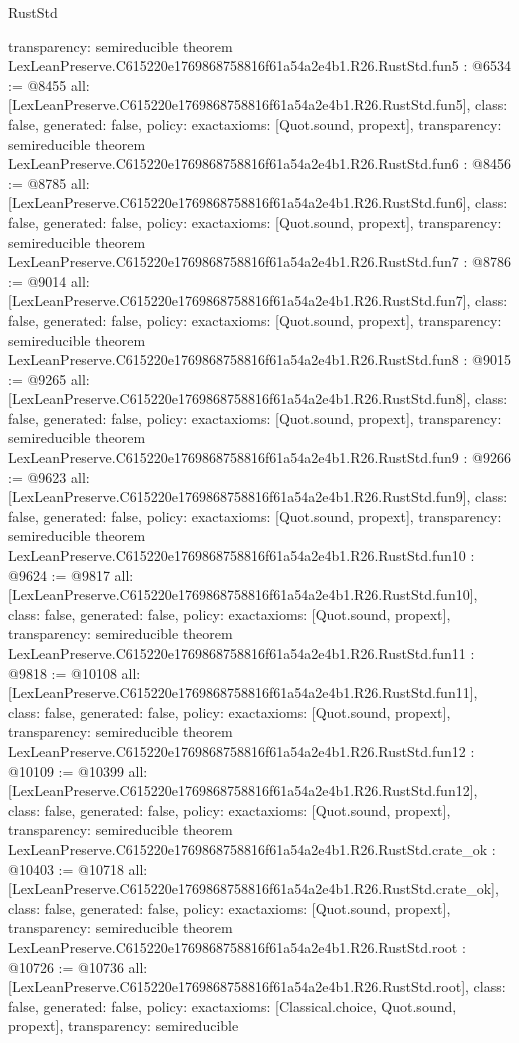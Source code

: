 \begin{lexlean}{RustStd}
\begin{coremodule}
{  transparency: semireducible
}
theorem LexLeanPreserve.C615220e1769868758816f61a54a2e4b1.R26.RustStd.fun5 : @6534 := @8455 {
  all: [LexLeanPreserve.C615220e1769868758816f61a54a2e4b1.R26.RustStd.fun5],
  class: false,
  generated: false,
  policy: exact{axioms: [Quot.sound, propext]},
  transparency: semireducible
}
theorem LexLeanPreserve.C615220e1769868758816f61a54a2e4b1.R26.RustStd.fun6 : @8456 := @8785 {
  all: [LexLeanPreserve.C615220e1769868758816f61a54a2e4b1.R26.RustStd.fun6],
  class: false,
  generated: false,
  policy: exact{axioms: [Quot.sound, propext]},
  transparency: semireducible
}
theorem LexLeanPreserve.C615220e1769868758816f61a54a2e4b1.R26.RustStd.fun7 : @8786 := @9014 {
  all: [LexLeanPreserve.C615220e1769868758816f61a54a2e4b1.R26.RustStd.fun7],
  class: false,
  generated: false,
  policy: exact{axioms: [Quot.sound, propext]},
  transparency: semireducible
}
theorem LexLeanPreserve.C615220e1769868758816f61a54a2e4b1.R26.RustStd.fun8 : @9015 := @9265 {
  all: [LexLeanPreserve.C615220e1769868758816f61a54a2e4b1.R26.RustStd.fun8],
  class: false,
  generated: false,
  policy: exact{axioms: [Quot.sound, propext]},
  transparency: semireducible
}
theorem LexLeanPreserve.C615220e1769868758816f61a54a2e4b1.R26.RustStd.fun9 : @9266 := @9623 {
  all: [LexLeanPreserve.C615220e1769868758816f61a54a2e4b1.R26.RustStd.fun9],
  class: false,
  generated: false,
  policy: exact{axioms: [Quot.sound, propext]},
  transparency: semireducible
}
theorem LexLeanPreserve.C615220e1769868758816f61a54a2e4b1.R26.RustStd.fun10 : @9624 := @9817 {
  all: [LexLeanPreserve.C615220e1769868758816f61a54a2e4b1.R26.RustStd.fun10],
  class: false,
  generated: false,
  policy: exact{axioms: [Quot.sound, propext]},
  transparency: semireducible
}
theorem LexLeanPreserve.C615220e1769868758816f61a54a2e4b1.R26.RustStd.fun11 : @9818 := @10108 {
  all: [LexLeanPreserve.C615220e1769868758816f61a54a2e4b1.R26.RustStd.fun11],
  class: false,
  generated: false,
  policy: exact{axioms: [Quot.sound, propext]},
  transparency: semireducible
}
theorem LexLeanPreserve.C615220e1769868758816f61a54a2e4b1.R26.RustStd.fun12 : @10109 := @10399 {
  all: [LexLeanPreserve.C615220e1769868758816f61a54a2e4b1.R26.RustStd.fun12],
  class: false,
  generated: false,
  policy: exact{axioms: [Quot.sound, propext]},
  transparency: semireducible
}
theorem LexLeanPreserve.C615220e1769868758816f61a54a2e4b1.R26.RustStd.crate_ok : @10403 := @10718 {
  all: [LexLeanPreserve.C615220e1769868758816f61a54a2e4b1.R26.RustStd.crate_ok],
  class: false,
  generated: false,
  policy: exact{axioms: [Quot.sound, propext]},
  transparency: semireducible
}
theorem LexLeanPreserve.C615220e1769868758816f61a54a2e4b1.R26.RustStd.root : @10726 := @10736 {
  all: [LexLeanPreserve.C615220e1769868758816f61a54a2e4b1.R26.RustStd.root],
  class: false,
  generated: false,
  policy: exact{axioms: [Classical.choice, Quot.sound, propext]},
  transparency: semireducible
}


\end{coremodule}
\end{lexlean}

